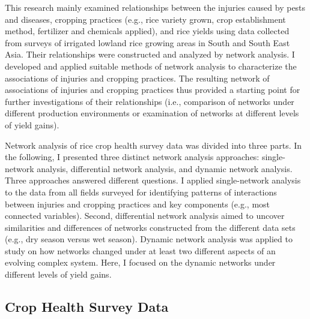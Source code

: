 

This research mainly examined relationships between the injuries caused by pests and diseases, cropping practices (e.g., rice variety grown, crop establishment method, fertilizer and chemicals applied), and rice yields using data collected from surveys of irrigated lowland rice growing areas in South and South East Asia. Their relationships were constructed and analyzed by network analysis. I developed and applied suitable methods of network analysis to characterize the associations of injuries and cropping practices. The resulting network of associations of injuries and cropping practices thus provided a starting point for further investigations of their relationships (i.e., comparison of networks under different production environments or examination of networks at different levels of yield gains). 

Network analysis of rice crop health survey data was divided into three parts. In the following, I presented three distinct network analysis approaches: single-network analysis, differential network analysis, and dynamic network analysis. Three approaches answered different questions. I applied single-network analysis to the data from all fields surveyed for identifying patterns of interactions  between injuries and cropping practices and key components (e.g., most connected variables). Second, differential network analysis aimed to uncover similarities and differences of networks constructed from the different data sets (e.g., dry season versus wet season). Dynamic network analysis was applied to study on how networks changed under at least two different aspects of an evolving complex system. Here, I focused on the dynamic networks under different levels of yield gains. 

\subsection*{Crop Health Survey Data}

